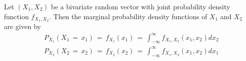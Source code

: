 \begin{theorem}
    Let $(X_{1}, X_{2})$ be a bivariate random vector with joint probability density function $f_{X_{1}, X_{2}}$. Then the marginal probability density functions of $X_{1}$ and $X_{2}$ are given by
    \begin{align*}
        &P_{X_{1}}(X_{1} \hspace{2pt} = \hspace{2pt} x_{1}) \hspace{2pt} = \hspace{2pt} f_{X_{1}}(x_{1}) \hspace{2pt} = \hspace{2pt} \int_{-\infty}^{\infty} f_{X_{1}, X_{2}}(x_{1}, x_{2}) dx_{2} \\[1ex]
        &P_{X_{2}}(X_{2} \hspace{2pt} = \hspace{2pt} x_{2}) \hspace{2pt} = \hspace{2pt} f_{X_{2}}(x_{2}) \hspace{2pt} = \hspace{2pt} \int_{-\infty}^{\infty} f_{X_{1}, X_{2}}(x_{1}, x_{2}) dx_{1}
    \end{align*}
\end{theorem}